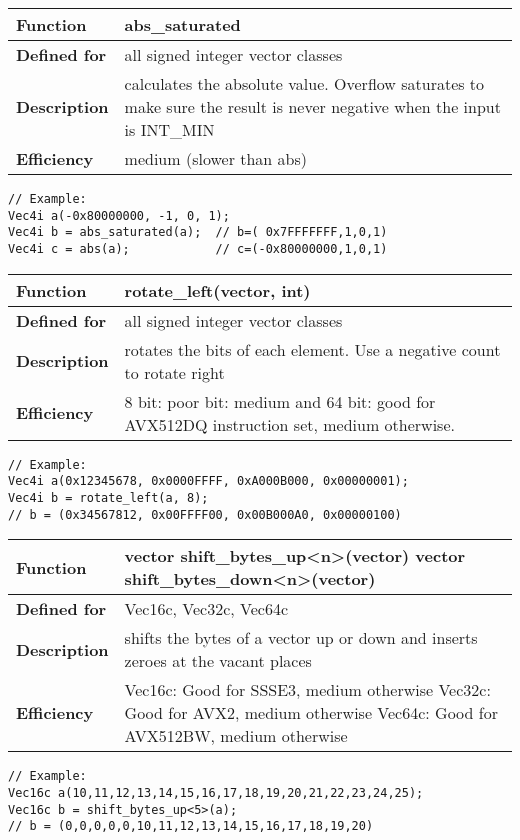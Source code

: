 \documentclass[vcl_manual.tex]{subfiles}
\begin{document}
\begin{tabular}{|p{25mm}|p{100mm}|}
\hline
\bfseries Function & abs\_saturated \\ \hline
\bfseries Defined for & all signed integer vector classes \\ \hline
\bfseries Description & calculates the absolute value. Overflow saturates to make sure the result is never negative when the input is INT\_MIN
 \\ \hline
\bfseries Efficiency & medium (slower than abs) \\ \hline
\end{tabular}
\begin{lstlisting}[frame=none]
// Example:
Vec4i a(-0x80000000, -1, 0, 1);
Vec4i b = abs_saturated(a);  // b=( 0x7FFFFFFF,1,0,1)
Vec4i c = abs(a);            // c=(-0x80000000,1,0,1)
\end{lstlisting}


\begin{tabular}{|p{25mm}|p{100mm}|}
\hline
\bfseries Function & rotate\_left(vector, int) \\ \hline
\bfseries Defined for & all signed integer vector classes \\ \hline
\bfseries Description & rotates the bits of each element. Use a negative count to rotate right \\ \hline
\bfseries Efficiency & 8 bit: poor \newline
16 bit: medium \newline
32 and 64 bit: good for AVX512DQ instruction set, medium otherwise.
 \\ \hline
\end{tabular}
\begin{lstlisting}[frame=none]
// Example:
Vec4i a(0x12345678, 0x0000FFFF, 0xA000B000, 0x00000001);
Vec4i b = rotate_left(a, 8);  
// b = (0x34567812, 0x00FFFF00, 0x00B000A0, 0x00000100)
\end{lstlisting}


\begin{tabular}{|p{25mm}|p{100mm}|}
\hline
\bfseries Function & 
vector shift\_bytes\_up\textless n\textgreater(vector)\newline
vector shift\_bytes\_down\textless n\textgreater(vector)
 \\ \hline
\bfseries Defined for & Vec16c, Vec32c, Vec64c \\ \hline
\bfseries Description & shifts the bytes of a vector up or down and inserts zeroes at the vacant places \\ \hline
\bfseries Efficiency &
Vec16c: Good for SSSE3, medium otherwise \newline
Vec32c: Good for AVX2, medium otherwise \newline
Vec64c: Good for AVX512BW, medium otherwise \\ \hline
\end{tabular}
\begin{lstlisting}[frame=none]
// Example:
Vec16c a(10,11,12,13,14,15,16,17,18,19,20,21,22,23,24,25);
Vec16c b = shift_bytes_up<5>(a);
// b = (0,0,0,0,0,10,11,12,13,14,15,16,17,18,19,20)
\end{lstlisting}
\end{document}
